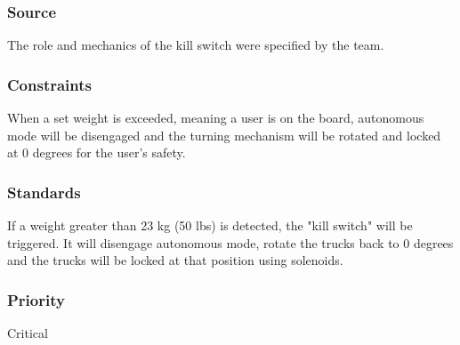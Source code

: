 \subsubsection{Source}
The role and mechanics of the kill switch were specified by the team.
\subsubsection{Constraints}
When a set weight is exceeded, meaning a user is on the board, autonomous mode will be disengaged and the turning mechanism will be rotated and locked at 0 degrees for the user's safety.
\subsubsection{Standards}
If a weight greater than 23 kg (50 lbs) is detected, the "kill switch" will be triggered. It will disengage autonomous mode, rotate the trucks back to 0 degrees and the trucks will be locked at that position using solenoids.
\subsubsection{Priority}
Critical